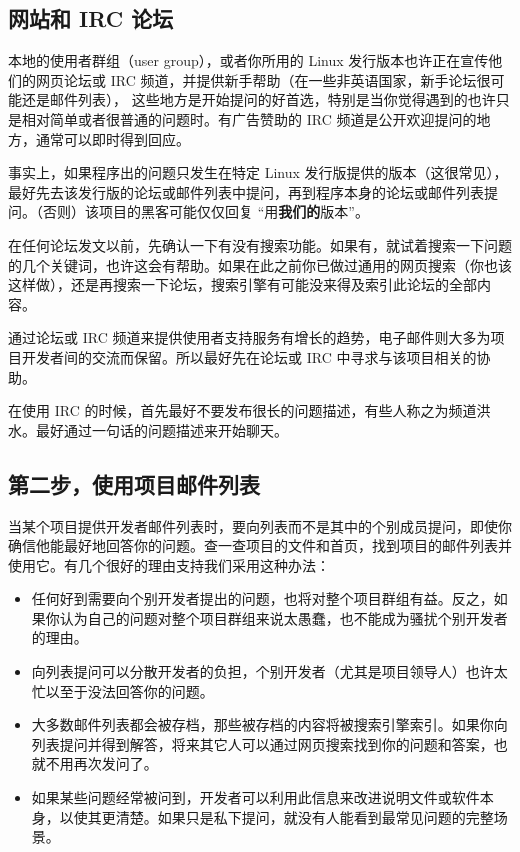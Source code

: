 \documentclass[titlepage]{article}
\begin{document}
\hypertarget{ux7f51ux7ad9ux548c-irc-ux8bbaux575b}{\subsection{网站和
IRC 论坛}\label{ux7f51ux7ad9ux548c-irc-ux8bbaux575b}}

本地的使用者群组（user group），或者你所用的 Linux
发行版本也许正在宣传他们的网页论坛或 IRC
频道，并提供新手帮助（在一些非英语国家，新手论坛很可能还是邮件列表），
这些地方是开始提问的好首选，特别是当你觉得遇到的也许只是相对简单或者很普通的问题时。有广告赞助的
IRC 频道是公开欢迎提问的地方，通常可以即时得到回应。

事实上，如果程序出的问题只发生在特定 Linux
发行版提供的版本（这很常见），最好先去该发行版的论坛或邮件列表中提问，再到程序本身的论坛或邮件列表提问。（否则）该项目的黑客可能仅仅回复
``用\textbf{我们的}版本''。

在任何论坛发文以前，先确认一下有没有搜索功能。如果有，就试着搜索一下问题的几个关键词，也许这会有帮助。如果在此之前你已做过通用的网页搜索（你也该这样做），还是再搜索一下论坛，搜索引擎有可能没来得及索引此论坛的全部内容。

通过论坛或 IRC
频道来提供使用者支持服务有增长的趋势，电子邮件则大多为项目开发者间的交流而保留。所以最好先在论坛或
IRC 中寻求与该项目相关的协助。

在使用 IRC
的时候，首先最好不要发布很长的问题描述，有些人称之为频道洪水。最好通过一句话的问题描述来开始聊天。

\hypertarget{ux7b2cux4e8cux6b65ux4f7fux7528ux9879ux76eeux90aeux4ef6ux5217ux8868}{\subsection{第二步，使用项目邮件列表}\label{ux7b2cux4e8cux6b65ux4f7fux7528ux9879ux76eeux90aeux4ef6ux5217ux8868}}

当某个项目提供开发者邮件列表时，要向列表而不是其中的个别成员提问，即使你确信他能最好地回答你的问题。查一查项目的文件和首页，找到项目的邮件列表并使用它。有几个很好的理由支持我们采用这种办法：

\begin{itemize}

\item
  任何好到需要向个别开发者提出的问题，也将对整个项目群组有益。反之，如果你认为自己的问题对整个项目群组来说太愚蠢，也不能成为骚扰个别开发者的理由。
\item
  向列表提问可以分散开发者的负担，个别开发者（尤其是项目领导人）也许太忙以至于没法回答你的问题。
\item
  大多数邮件列表都会被存档，那些被存档的内容将被搜索引擎索引。如果你向列表提问并得到解答，将来其它人可以通过网页搜索找到你的问题和答案，也就不用再次发问了。
\item
  如果某些问题经常被问到，开发者可以利用此信息来改进说明文件或软件本身，以使其更清楚。如果只是私下提问，就没有人能看到最常见问题的完整场景。
\end{itemize}
\end{document}
